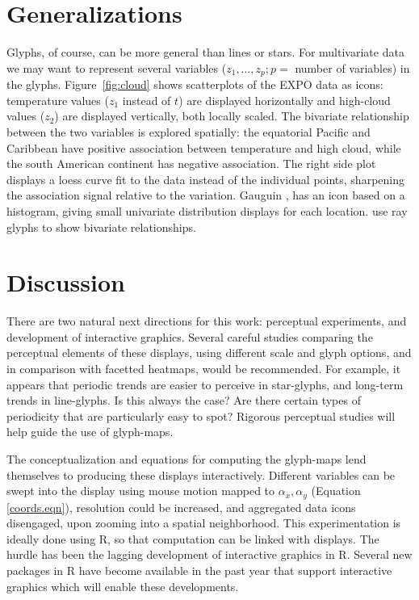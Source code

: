 \documentclass[oneside]{article}
\begin{document}
\section{Generalizations}

Glyphs, of course, can be more general than lines or stars. For multivariate data we may want to represent several variables ($z_1, \dots, z_p; p=$ number of variables) in the glyphs. Figure~\ref{fig:cloud} shows scatterplots of the EXPO data as icons: temperature values ($z_1$ instead of $t$) are displayed horizontally and high-cloud values ($z_2$) are displayed vertically, both locally scaled. The bivariate relationship between the two variables is explored spatially: the equatorial Pacific and Caribbean have positive association between temperature and high cloud, while the south American continent has negative association. The right side plot displays a loess curve fit to the data instead of the individual points, sharpening the association signal relative to the variation. Gauguin \citep{gribov:2006}, has an icon based on a histogram, giving small univariate distribution displays for each location. \citet{carr:1992} use ray glyphs to show bivariate relationships.

\section{Discussion}

There are two natural next directions for this work: perceptual experiments, and development of interactive graphics. Several careful studies comparing the perceptual elements of these displays, using different scale and glyph options, and in comparison with facetted heatmaps, would be recommended. For example, it appears that periodic trends are easier to perceive in star-glyphs, and long-term trends in line-glyphs. Is this always the case? Are there certain types of periodicity that are particularly easy to spot? Rigorous perceptual studies will help guide the use of glyph-maps.

The conceptualization and equations for computing the glyph-maps lend themselves to producing these displays interactively. Different variables can be swept into the display using mouse motion mapped to $\alpha_x, \alpha_y$ (Equation \ref{coords.eqn}), resolution could be increased, and aggregated data icons disengaged, upon zooming into a spatial neighborhood. This experimentation is ideally done using R, so that computation can be linked with displays. The hurdle has been the lagging development of interactive graphics in R. Several new packages  in R have become available in the past year \citep{qtbase, qtpaint, plumbr} that support interactive graphics which will enable these developments.
\end{document}
